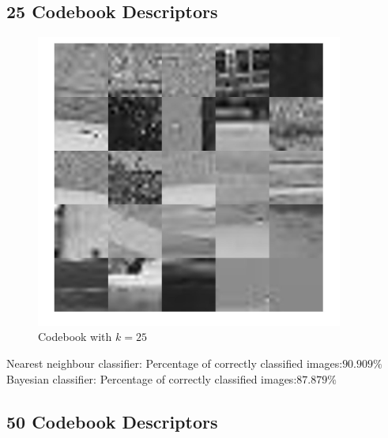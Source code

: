 \documentclass[12pt]{article}
\begin{document}
\subsection{25 Codebook Descriptors}
\vspace{5mm}
\begin{figure}[H]
	\centering
	\includegraphics[width=0.9\textwidth]{k25.jpg}
	\caption{Codebook with $k=25$}
	\label{fig1}
\end{figure}
\vspace{5mm}
Nearest neighbour classifier: 
\newline
Percentage of correctly classified images:$90.909\%$
\vspace{5mm}
\newline
Bayesian classifier: 
\newline
Percentage of correctly classified images:$87.879\%$

\subsection{50 Codebook Descriptors}
\end{document}
